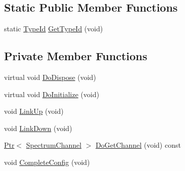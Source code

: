 \subsection*{Static Public Member Functions}
\begin{DoxyCompactItemize}
\item 
static \hyperlink{classns3_1_1TypeId}{Type\+Id} \hyperlink{classns3_1_1LrWpanNetDevice_acef1e5cfc71b10c0de1f57657fff2d44}{Get\+Type\+Id} (void)
\end{DoxyCompactItemize}
\subsection*{Private Member Functions}
\begin{DoxyCompactItemize}
\item 
virtual void \hyperlink{classns3_1_1LrWpanNetDevice_a192da12a4c92d05c57387c85c7c92910}{Do\+Dispose} (void)
\item 
virtual void \hyperlink{classns3_1_1LrWpanNetDevice_a04bbccce73ca560ec1a0c35a6e6dd805}{Do\+Initialize} (void)
\item 
void \hyperlink{classns3_1_1LrWpanNetDevice_a3758f4020cfabbc652dd2f6299f5b129}{Link\+Up} (void)
\item 
void \hyperlink{classns3_1_1LrWpanNetDevice_ab5a740714edeaf85ebd01b4c065e90b2}{Link\+Down} (void)
\item 
\hyperlink{classns3_1_1Ptr}{Ptr}$<$ \hyperlink{classns3_1_1SpectrumChannel}{Spectrum\+Channel} $>$ \hyperlink{classns3_1_1LrWpanNetDevice_a10023e92e2b456edf04b85a7d5a6eee9}{Do\+Get\+Channel} (void) const 
\item 
void \hyperlink{classns3_1_1LrWpanNetDevice_a2851594198a88409d0a25401e9c61997}{Complete\+Config} (void)
\end{DoxyCompactItemize}
